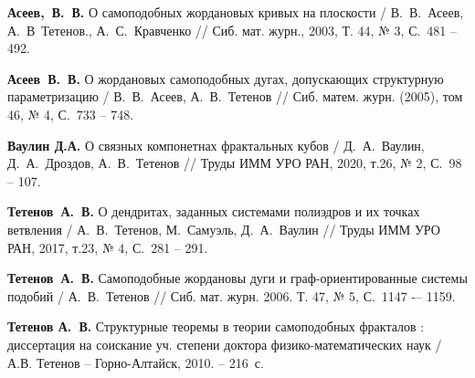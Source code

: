 \begin{thebibliography}{99}
{\bf Асеев,~В.~В.} 
О самоподобных жордановых кривых на плоскости / 
В.~В.~Асеев, А.~В~Тетенов., А.~С.~Кравченко //
Сиб. мат. журн., 2003, Т. 44, № 3, С.~481 -- 492.

{\bf Асеев~В.~В.} 
О жордановых самоподобных дугах, допускающих структурную параметризацию /
В.~В.~Асеев, А.~В.~Тетенов //
Сиб. матем. журн. (2005), том 46, № 4, С.~733 -- 748.

{\bf Ваулин Д.А.}
О связных компонетнах фрактальных кубов / 
Д.~А.~Ваулин, Д.~А.~Дроздов, А.~В.~Тетенов //
Труды ИММ УРО РАН, 2020, т.26, № 2, С.~98 -- 107.

{\bf Тетенов~А.~В.}  
О дендритах, заданных системами полиэдров и их точках ветвления /
А.~В.~Тетенов, М.~Самуэль, Д.~А.~Ваулин // 
Труды ИММ УРО РАН, 2017, т.23, № 4, С.~281 -- 291.

{\bf Тетенов~А.~В.}
Самоподобные жордановы дуги и граф-ориентированные системы подобий /
А.~В.~Тетенов //
Сиб. мат. журн. 2006. Т. 47, № 5, С.~1147 -– 1159.

{\bf Тетенов А.~В.} 
Структурные теоремы в теории самоподобных фракталов : диссертация на соискание уч. степени доктора физико-математических наук / А.В. Тетенов -- Горно-Алтайск, 2010. -- 216~с. 


%







\end{thebibliography}
